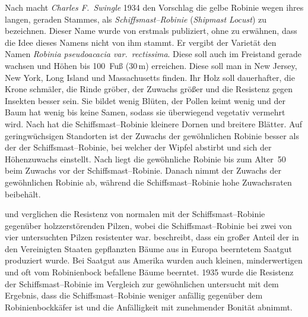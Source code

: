 \documentclass[twocolumn]{scrartcl}
\begin{document}
Nach \cite{detwiler1937robinie} macht \emph{Charles F.\ Swingle} 1934
den Vorschlag die gelbe Robinie wegen ihres langen, geraden Stammes,
als \emph{Schiffsmast--Robinie} (\emph{Shipmast Locust}) zu
bezeichnen. Dieser Name wurde von \cite{raber1936shipmast} erstmals
publiziert, ohne zu erwähnen, dass die Idee dieses Namens nicht von ihm
stammt. Er vergibt der Varietät den Namen \emph{Robinia pseudoacacia
var.\ rectissima}. Diese soll auch im Freistand gerade wachsen und
Höhen bis 100~Fuß (30\,m) erreichen. Diese soll man in New Jersey, New
York, Long Island und Massachusetts finden. Ihr Holz soll dauerhafter,
die Krone schmäler, die Rinde gröber, der Zuwachs größer und die
Resistenz gegen Insekten besser sein. Sie bildet wenig Blüten, der
Pollen keimt wenig und der Baum hat wenig bis keine Samen, sodass sie
überwiegend vegetativ vermehrt wird.
Nach \cite{hopp1941robinieUnterschied} hat die
Schiffsmast--Robinie kleinere Dornen und breitere Blätter. Auf
geringwüchsigen Standorten ist der Zuwachs der gewöhnlichen Robinie
besser als der der Schiffsmast--Robinie, bei welcher der Wipfel
abstirbt und sich der Höhenzuwachs einstellt.
Nach \cite{hopp1947robinie} liegt die gewöhnliche Robinie bis zum Alter~50
beim Zuwachs vor der
Schiffsmast--Robinie. Danach nimmt der Zuwachs der gewöhnlichen
Robinie ab, während die Schiffsmast--Robinie hohe Zuwachsraten
beibehält.

\cite{hirt1938robinie} und \cite{toole1938robinie} verglichen die Resistenz von
normalen mit der Schiffsmast--Robinie gegenüber holzzerstörenden Pilzen, wobei
die Schiffsmast--Robinie bei zwei von vier untersuchten Pilzen resistenter war.
\cite{hall1937robinie} beschreibt, dass ein großer Anteil der in den Vereinigten
Staaten gepflanzten Bäume aus in Europa beerntetem Saatgut produziert wurde. Bei
Saatgut aus Amerika wurden auch kleinen, minderwertigen und oft vom Robinienbock
befallene Bäume beerntet. 1935 wurde die Resistenz der Schiffsmast--Robinie im
Vergleich zur gewöhnlichen untersucht mit dem Ergebnis, dass die
Schiffsmast--Robinie weniger anfällig gegenüber dem Robinienbockkäfer ist und
die Anfälligkeit mit zunehmender Bonität abnimmt.
\end{document}
